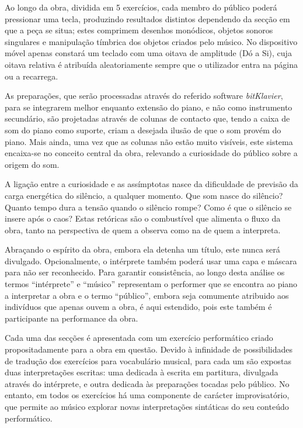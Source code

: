 \documentclass[../main.tex]{subfiles}
\begin{document}
Ao longo da obra, dividida em 5 exercícios, cada membro do público poderá pressionar uma tecla, produzindo resultados distintos dependendo da secção em que a peça se situa; estes comprimem desenhos monódicos, objetos sonoros singulares e manipulação tímbrica dos objetos criados pelo músico. No dispositivo móvel apenas constará um teclado com uma oitava de amplitude (Dó a Si), cuja oitava relativa é atribuída aleatoriamente sempre que o utilizador entra na página ou a recarrega.

As preparações, que serão processadas através do referido software \textsl{bitKlavier}, para se integrarem melhor enquanto extensão do piano, e não como instrumento secundário, são projetadas através de colunas de contacto que, tendo a caixa de som do piano como suporte, criam a desejada ilusão de que o som provém do piano. Mais ainda, uma vez que as colunas não estão muito visíveis, este sistema encaixa-se no conceito central da obra, relevando a curiosidade do público sobre a origem do som.

A ligação entre a curiosidade e as assímptotas nasce da dificuldade de previsão da carga energética do silêncio, a qualquer momento. Que som nasce do silêncio? Quanto tempo dura a tensão quando o silêncio rompe? Como é que o silêncio se insere após o caos? Estas retóricas são o combustível que alimenta o fluxo da obra, tanto na perspectiva de quem a observa como na de quem a interpreta.

Abraçando o espírito da obra, embora ela detenha um título, este nunca será divulgado. Opcionalmente, o intérprete também poderá usar uma capa e máscara para não ser reconhecido. Para garantir consistência, ao longo desta análise os termos \enquote{intérprete} e \enquote{músico} representam o performer que se encontra ao piano a interpretar a obra e o termo \enquote{público}, embora seja comumente atribuido aos indivíduos que apenas ouvem a obra, é aqui estendido, pois este também é participante na performance da obra.


Cada uma das secções é apresentada com um exercício performático criado propositadamente para a obra em questão. Devido à infinidade de possibilidades de tradução dos exercícios para vocabulário musical, para cada um são expostas duas interpretações escritas: uma dedicada à escrita em partitura, divulgada através do intérprete, e outra dedicada às preparações tocadas pelo público. No entanto, em todos os exercícios há uma componente de carácter improvisatório, que permite ao músico explorar novas interpretações sintáticas do seu conteúdo performático.
\end{document}
